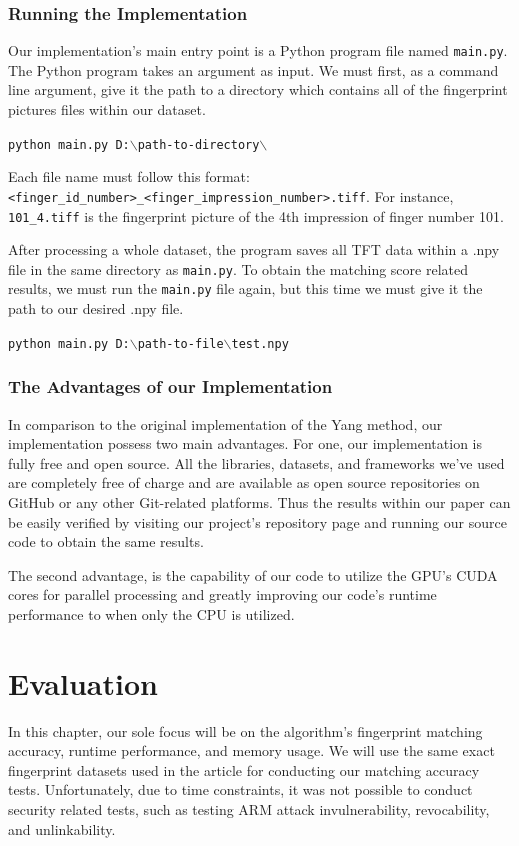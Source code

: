 \documentclass[fyp]{socreport}
\begin{document}
\subsection{Running the Implementation}
Our implementation's main entry point is a Python program file named \texttt{main.py}. The Python program takes an argument as input. We must first, as a command line argument, give it the path to a directory which contains all of the fingerprint pictures files within our dataset.
\begin{center}
	\texttt{python main.py D:$\backslash$path-to-directory$\backslash$}
\end{center}
Each file name must follow this format: \texttt{<finger\_id\_number>\_<finger\_impression\_number>.tiff}. For instance, \texttt{101\_4.tiff} is the fingerprint picture of the 4th impression of finger number 101.

After processing a whole dataset, the program saves all TFT data within a .npy file in the same directory as \texttt{main.py}. To obtain the matching score related results, we must run the \texttt{main.py} file again, but this time we must give it the path to our desired .npy file.
\begin{center}
	\texttt{python main.py D:$\backslash$path-to-file$\backslash$test.npy}
\end{center}

\subsection{The Advantages of our Implementation}
In comparison to the original implementation of the Yang method, our implementation possess two main advantages. For one, our implementation is fully free and open source. All the libraries, datasets, and frameworks we've used are completely free of charge and are available as open source repositories on GitHub or any other Git-related platforms. Thus the results within our paper can be easily verified by visiting our project's repository page and running our source code to obtain the same results.

The second advantage, is the capability of our code to utilize the GPU's CUDA cores for parallel processing and greatly improving our code's runtime performance to when only the CPU is utilized.

\chapter{Evaluation}
In this chapter, our sole focus will be on the algorithm's fingerprint matching accuracy, runtime performance, and memory usage. We will use the same exact fingerprint datasets used in the article for conducting our matching accuracy tests. Unfortunately, due to time constraints, it was not possible to conduct security related tests, such as testing ARM attack invulnerability, revocability, and unlinkability. 
\end{document}
